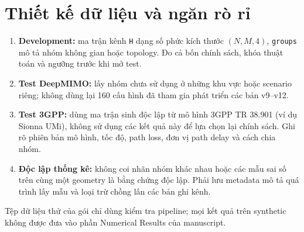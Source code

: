 \documentclass[11pt,onecolumn]{IEEEtran}
\begin{document}
\section{Thiết kế dữ liệu và ngăn rò rỉ}
\begin{enumerate}
\item \textbf{Development:} ma trận kênh \texttt{H} dạng số phức kích thước $(N,M,4)$, \texttt{groups} mô tả nhóm không gian hoặc topology. Đo cả bốn chính sách, khóa thuật toán và ngưỡng trước khi mở test.
\item \textbf{Test DeepMIMO:} lấy nhóm chưa sử dụng ở những khu vực hoặc scenario riêng; không dùng lại 160 cấu hình đã tham gia phát triển các bản v9--v12.
\item \textbf{Test 3GPP:} dùng ma trận sinh độc lập từ mô hình 3GPP TR 38.901 (ví dụ Sionna UMi), không sử dụng các kết quả này để lựa chọn lại chính sách. Ghi rõ phiên bản mô hình, tốc độ, path loss, đơn vị path delay và cách chia nhóm.
\item \textbf{Độc lập thống kê:} không coi nhãn nhóm khác nhau hoặc các mẫu sai số trên cùng một geometry là bằng chứng độc lập. Phải lưu metadata mô tả quá trình lấy mẫu và loại trừ chồng lấn các bản ghi kênh.
\end{enumerate}
Tệp dữ liệu thử của gói chỉ dùng kiểm tra pipeline; mọi kết quả trên synthetic không được đưa vào phần Numerical Results của manuscript.
\end{document}
